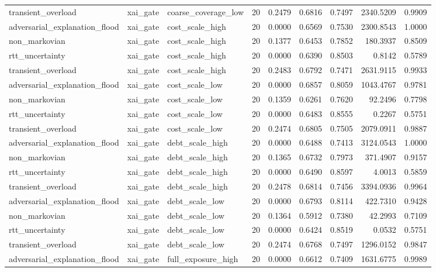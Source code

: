 \begin{table}[t]
\begin{tabular}{lllrrrrrr}
transient\_overload & xai\_gate & coarse\_coverage\_low & 20 & 0.2479 & 0.6816 & 0.7497 & 2340.5209 & 0.9909 \\
adversarial\_explanation\_flood & xai\_gate & cost\_scale\_high & 20 & 0.0000 & 0.6569 & 0.7530 & 2300.8543 & 1.0000 \\
non\_markovian & xai\_gate & cost\_scale\_high & 20 & 0.1377 & 0.6453 & 0.7852 & 180.3937 & 0.8509 \\
rtt\_uncertainty & xai\_gate & cost\_scale\_high & 20 & 0.0000 & 0.6390 & 0.8503 & 0.8142 & 0.5789 \\
transient\_overload & xai\_gate & cost\_scale\_high & 20 & 0.2483 & 0.6792 & 0.7471 & 2631.9115 & 0.9933 \\
adversarial\_explanation\_flood & xai\_gate & cost\_scale\_low & 20 & 0.0000 & 0.6857 & 0.8059 & 1043.4767 & 0.9781 \\
non\_markovian & xai\_gate & cost\_scale\_low & 20 & 0.1359 & 0.6261 & 0.7620 & 92.2496 & 0.7798 \\
rtt\_uncertainty & xai\_gate & cost\_scale\_low & 20 & 0.0000 & 0.6483 & 0.8555 & 0.2267 & 0.5751 \\
transient\_overload & xai\_gate & cost\_scale\_low & 20 & 0.2474 & 0.6805 & 0.7505 & 2079.0911 & 0.9887 \\
adversarial\_explanation\_flood & xai\_gate & debt\_scale\_high & 20 & 0.0000 & 0.6488 & 0.7413 & 3124.0543 & 1.0000 \\
non\_markovian & xai\_gate & debt\_scale\_high & 20 & 0.1365 & 0.6732 & 0.7973 & 371.4907 & 0.9157 \\
rtt\_uncertainty & xai\_gate & debt\_scale\_high & 20 & 0.0000 & 0.6490 & 0.8597 & 4.0013 & 0.5859 \\
transient\_overload & xai\_gate & debt\_scale\_high & 20 & 0.2478 & 0.6814 & 0.7456 & 3394.0936 & 0.9964 \\
adversarial\_explanation\_flood & xai\_gate & debt\_scale\_low & 20 & 0.0000 & 0.6793 & 0.8114 & 422.7310 & 0.9428 \\
non\_markovian & xai\_gate & debt\_scale\_low & 20 & 0.1364 & 0.5912 & 0.7380 & 42.2993 & 0.7109 \\
rtt\_uncertainty & xai\_gate & debt\_scale\_low & 20 & 0.0000 & 0.6424 & 0.8519 & 0.0532 & 0.5751 \\
transient\_overload & xai\_gate & debt\_scale\_low & 20 & 0.2474 & 0.6768 & 0.7497 & 1296.0152 & 0.9847 \\
adversarial\_explanation\_flood & xai\_gate & full\_exposure\_high & 20 & 0.0000 & 0.6612 & 0.7409 & 1631.6775 & 0.9989 \\

\end{tabular}
\end{table}
